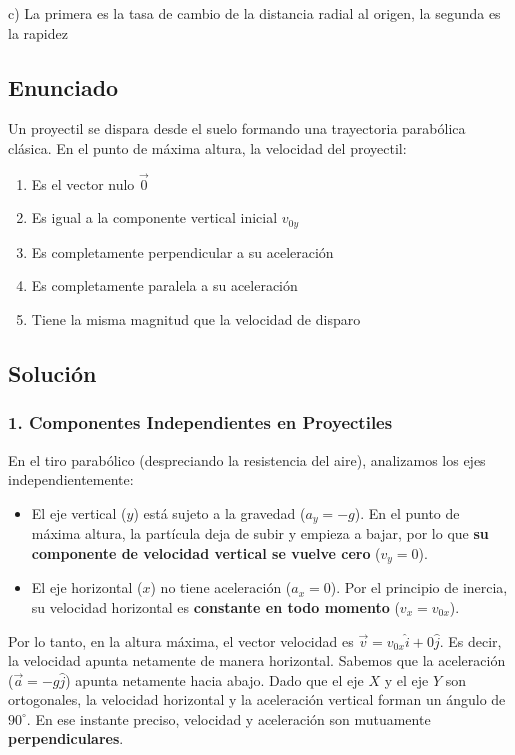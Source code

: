\documentclass[12pt, a4paper]{article}
\begin{document}
\begin{tcolorbox}[colback=green!5!white, colframe=green!50!black, title=Respuesta Final]
\centering \Large c) La primera es la tasa de cambio de la distancia radial al origen, la segunda es la rapidez
\end{tcolorbox}

\newpage

\subsection*{Enunciado}
Un proyectil se dispara desde el suelo formando una trayectoria parabólica clásica. En el punto de máxima altura, la velocidad del proyectil:
\begin{enumerate}[label=\alph*)]
    \item Es el vector nulo $\vec{0}$
    \item Es igual a la componente vertical inicial $v_{0y}$
    \item Es completamente perpendicular a su aceleración
    \item Es completamente paralela a su aceleración
    \item Tiene la misma magnitud que la velocidad de disparo
\end{enumerate}

\subsection*{Solución}

\subsubsection*{1. Componentes Independientes en Proyectiles}
En el tiro parabólico (despreciando la resistencia del aire), analizamos los ejes independientemente:
\begin{itemize}
    \item El eje vertical ($y$) está sujeto a la gravedad ($a_y = -g$). En el punto de máxima altura, la partícula deja de subir y empieza a bajar, por lo que \textbf{su componente de velocidad vertical se vuelve cero} ($v_y = 0$).
    \item El eje horizontal ($x$) no tiene aceleración ($a_x = 0$). Por el principio de inercia, su velocidad horizontal es \textbf{constante en todo momento} ($v_x = v_{0x}$).
\end{itemize}

Por lo tanto, en la altura máxima, el vector velocidad es $\vec{v} = v_{0x}\hat{i} + 0\hat{j}$. Es decir, la velocidad apunta netamente de manera horizontal.
Sabemos que la aceleración ($\vec{a} = -g\hat{j}$) apunta netamente hacia abajo. 
Dado que el eje $X$ y el eje $Y$ son ortogonales, la velocidad horizontal y la aceleración vertical forman un ángulo de $90^\circ$. En ese instante preciso, velocidad y aceleración son mutuamente \textbf{perpendiculares}.
\end{document}
